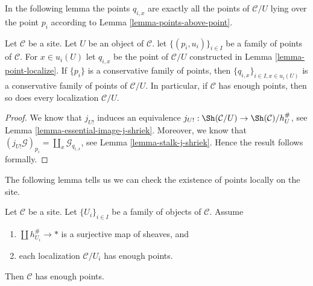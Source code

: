 \noindent
In the following lemma the points $q_{i, x}$ are exactly all the points
of $\mathcal{C}/U$ lying over the point $p_i$ according to
Lemma \ref{lemma-points-above-point}.

\begin{lemma}
\label{lemma-localize-enough}
Let $\mathcal{C}$ be a site. Let $U$ be an object of $\mathcal{C}$.
let $\{(p_i, u_i)\}_{i\in I}$ be a family of points of $\mathcal{C}$.
For $x \in u_i(U)$ let $q_{i, x}$ be the point of $\mathcal{C}/U$
constructed in
Lemma \ref{lemma-point-localize}.
If $\{p_i\}$ is a conservative family of points, then
$\{q_{i, x}\}_{i \in I, x \in u_i(U)}$ is a conservative
family of points of $\mathcal{C}/U$.
In particular, if $\mathcal{C}$ has enough points, then so
does every localization $\mathcal{C}/U$.
\end{lemma}

\begin{proof}
We know that $j_{U!}$ induces an equivalence
$j_{U!} : \Sh(\mathcal{C}/U) \to \Sh(\mathcal{C})/h_U^\#$, see
Lemma \ref{lemma-essential-image-j-shriek}.
Moreover, we know that
$(j_{U!}\mathcal{G})_{p_i} = \coprod_x \mathcal{G}_{q_{i, x}}$, see
Lemma \ref{lemma-stalk-j-shriek}.
Hence the result follows formally.
\end{proof}

\noindent
The following lemma tells us we can check the existence of points
locally on the site.

\begin{lemma}
\label{lemma-enough-points-local}
Let $\mathcal{C}$ be a site. Let $\{U_i\}_{i \in I}$ be a family of
objects of $\mathcal{C}$. Assume
\begin{enumerate}
\item $\coprod h_{U_i}^\# \to *$ is a surjective map of sheaves, and
\item each localization $\mathcal{C}/U_i$ has enough points.
\end{enumerate}
Then $\mathcal{C}$ has enough points.
\end{lemma}

